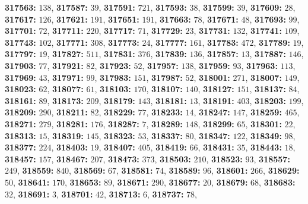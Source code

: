 \textsf{\bfseries 317563:} $138$, \textsf{\bfseries 317587:} $39$, \textsf{\bfseries 317591:} $721$, \textsf{\bfseries 317593:} $38$, \textsf{\bfseries 317599:} $39$, \textsf{\bfseries 317609:} $28$, \textsf{\bfseries 317617:} $126$, \textsf{\bfseries 317621:} $191$, \textsf{\bfseries 317651:} $191$, \textsf{\bfseries 317663:} $78$, \textsf{\bfseries 317671:} $48$, \textsf{\bfseries 317693:} $99$, \textsf{\bfseries 317701:} $72$, \textsf{\bfseries 317711:} $220$, \textsf{\bfseries 317717:} $71$, \textsf{\bfseries 317729:} $23$, \textsf{\bfseries 317731:} $132$, \textsf{\bfseries 317741:} $109$, \textsf{\bfseries 317743:} $102$, \textsf{\bfseries 317771:} $308$, \textsf{\bfseries 317773:} $24$, \textsf{\bfseries 317777:} $161$, \textsf{\bfseries 317783:} $472$, \textsf{\bfseries 317789:} $19$, \textsf{\bfseries 317797:} $19$, \textsf{\bfseries 317827:} $511$, \textsf{\bfseries 317831:} $376$, \textsf{\bfseries 317839:} $136$, \textsf{\bfseries 317857:} $13$, \textsf{\bfseries 317887:} $146$, \textsf{\bfseries 317903:} $77$, \textsf{\bfseries 317921:} $82$, \textsf{\bfseries 317923:} $52$, \textsf{\bfseries 317957:} $138$, \textsf{\bfseries 317959:} $93$, \textsf{\bfseries 317963:} $113$, \textsf{\bfseries 317969:} $43$, \textsf{\bfseries 317971:} $99$, \textsf{\bfseries 317983:} $151$, \textsf{\bfseries 317987:} $52$, \textsf{\bfseries 318001:} $271$, \textsf{\bfseries 318007:} $149$, \textsf{\bfseries 318023:} $62$, \textsf{\bfseries 318077:} $61$, \textsf{\bfseries 318103:} $170$, \textsf{\bfseries 318107:} $140$, \textsf{\bfseries 318127:} $151$, \textsf{\bfseries 318137:} $84$, \textsf{\bfseries 318161:} $89$, \textsf{\bfseries 318173:} $209$, \textsf{\bfseries 318179:} $143$, \textsf{\bfseries 318181:} $13$, \textsf{\bfseries 318191:} $403$, \textsf{\bfseries 318203:} $199$, \textsf{\bfseries 318209:} $290$, \textsf{\bfseries 318211:} $82$, \textsf{\bfseries 318229:} $77$, \textsf{\bfseries 318233:} $14$, \textsf{\bfseries 318247:} $147$, \textsf{\bfseries 318259:} $465$, \textsf{\bfseries 318271:} $279$, \textsf{\bfseries 318281:} $176$, \textsf{\bfseries 318287:} $7$, \textsf{\bfseries 318289:} $148$, \textsf{\bfseries 318299:} $65$, \textsf{\bfseries 318301:} $22$, \textsf{\bfseries 318313:} $15$, \textsf{\bfseries 318319:} $145$, \textsf{\bfseries 318323:} $53$, \textsf{\bfseries 318337:} $80$, \textsf{\bfseries 318347:} $122$, \textsf{\bfseries 318349:} $98$, \textsf{\bfseries 318377:} $224$, \textsf{\bfseries 318403:} $19$, \textsf{\bfseries 318407:} $405$, \textsf{\bfseries 318419:} $66$, \textsf{\bfseries 318431:} $35$, \textsf{\bfseries 318443:} $18$, \textsf{\bfseries 318457:} $157$, \textsf{\bfseries 318467:} $207$, \textsf{\bfseries 318473:} $373$, \textsf{\bfseries 318503:} $210$, \textsf{\bfseries 318523:} $93$, \textsf{\bfseries 318557:} $249$, \textsf{\bfseries 318559:} $840$, \textsf{\bfseries 318569:} $67$, \textsf{\bfseries 318581:} $74$, \textsf{\bfseries 318589:} $96$, \textsf{\bfseries 318601:} $266$, \textsf{\bfseries 318629:} $50$, \textsf{\bfseries 318641:} $170$, \textsf{\bfseries 318653:} $89$, \textsf{\bfseries 318671:} $290$, \textsf{\bfseries 318677:} $20$, \textsf{\bfseries 318679:} $68$, \textsf{\bfseries 318683:} $32$, \textsf{\bfseries 318691:} $3$, \textsf{\bfseries 318701:} $42$, \textsf{\bfseries 318713:} $6$, \textsf{\bfseries 318737:} $78$, 
